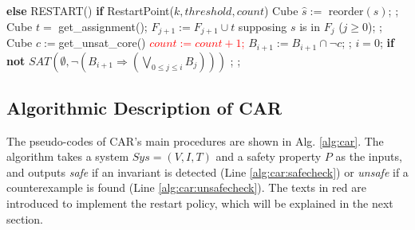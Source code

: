 \begin{algorithm}[thb]
\begin{algorithmic}[1]
            \State \textbf{else} {\color{red} RESTART()}\label{alg:car:loopend}  \label{alg:car:end}\label{alg:car:restartcall}
       \EndWhile         
\vspace{6pt}
       \label{alg:car:unsafecheckstart}
       \State \textbf{if} {\color{red}\sc RestartPoint($k,threshold, count$)}\label{alg:car:restart} 
       \State {}
       \State \qquad {}\label{alg:car:restartend} 
       \State Cube $\hat{s} := $ {\sc reorder}$(s)$;\label{alg:car:reorder} 
             ;\label{alg:car:level0} \EndIf
            \State Cube $t = $ {\sf get\_assignment()};\label{alg:car:getassignment}                 
            \State $F_{j+1} := F_{j+1} \cup t$ supposing $s$ is in $F_j$ ($j\geq 0$); 
            \label{alg:car:unsafecheckrecursive} ; \EndIf           
       \EndWhile\label{alg:backcar:unsafecheck:loop-end}
       \State Cube $c := ${\sf get\_unsat\_core()} \label{alg:car:getunsatcore}
       \State \textcolor{red}{$count := count + 1$;}\label{alg:car:countplus}
       \State $B_{i+1} := B_{i+1}\cap \neg c$;   
       \State {};
       \EndProcedure \label{alg:car:unsafecheckend}              
 \vspace{6pt}
       \label{alg:car:safecheckstart}               
       \State $i = 0$;
            \State \textbf{if} {\bf not} $SAT(\emptyset,\neg(B_{i+1}\Rightarrow(\bigvee_{0\leq j\leq i}B_j)))$
            \State \qquad {}; 
       \EndWhile
       \State {};
       \EndProcedure \label{alg:car:safecheckend}              
     \end{algorithmic}
\end{algorithm}
\subsection{Algorithmic Description of CAR}
The pseudo-codes of CAR's main procedures are shown in Alg. \ref{alg:car}.  The algorithm takes a system $Sys=(V,I,T)$ and a safety property $P$ as the inputs, and outputs \emph{safe} if an invariant is detected (Line \ref{alg:car:safecheck}) or \emph{unsafe} if a counterexample is found (Line \ref{alg:car:unsafecheck}). The texts in red are introduced to implement the restart policy, which will be explained in the next section. 


